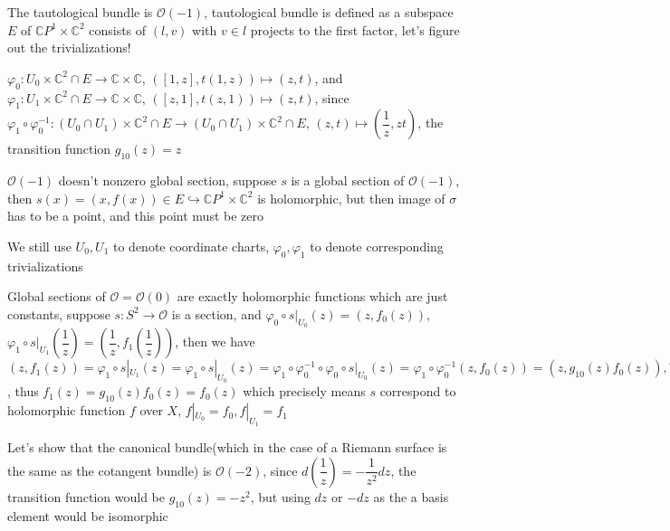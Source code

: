 \documentclass[main]{subfiles}
\begin{document}
\begin{definition}
The tautological bundle is $\mathcal{O}(-1)$, tautological bundle is defined as a subspace $E$ of $\mathbb CP^1\times\mathbb C^2$ consists of $(l,v)$ with $v\in l$ projects to the first factor, let's figure out the trivializations! \par
$\varphi_0: U_0\times\mathbb C^2\cap E\to\mathbb C\times\mathbb C$, $([1,z],t(1,z))\mapsto(z,t)$, and $\varphi_1: U_1\times\mathbb C^2\cap E\to\mathbb C\times\mathbb C$, $([z,1],t(z,1))\mapsto(z,t)$, since $\varphi_1\circ\varphi_0^{-1}: (U_0\cap U_1)\times\mathbb C^2\cap E\to(U_0\cap U_1)\times\mathbb C^2\cap E$, $(z,t)\mapsto\left(\dfrac{1}{z},zt\right)$, the transition function $g_{10}(z)=z$ \par
\end{definition}

\begin{remark}
$\mathcal{O}(-1)$ doesn't nonzero global section, suppose $s$ is a global section of $\mathcal{O}(-1)$, then $s(x)=(x,f(x))\in E\hookrightarrow\mathbb CP^1\times\mathbb C^2$ is holomorphic, but then image of $\sigma$ has to be a point, and this point must be zero\par
\end{remark}

\begin{example}
We still use $U_0,U_1$ to denote coordinate charts, $\varphi_0,\varphi_1$ to denote corresponding trivializations \par
Global sections of $\mathcal{O}=\mathcal{O}(0)$ are exactly holomorphic functions which are just constants, suppose $s: S^2\to \mathcal{O}$ is a section, and $\varphi_0\circ s|_{U_0}(z)=(z,f_0(z))$, $\varphi_1\circ s|_{U_1}\left(\dfrac{1}{z}\right)=\left(\dfrac{1}{z},f_1\left(\dfrac{1}{z}\right)\right)$, then we have $(z,f_1(z))=\varphi_1\circ s|_{U_1}(z)=\varphi_1\circ s|_{U_0}(z)=\varphi_1\circ\varphi_0^{-1}\circ\varphi_0\circ s|_{U_0}(z)=\varphi_1\circ\varphi_0^{-1}(z,f_0(z))=(z,g_{10}(z)f_0(z)), \forall z\in U_0\cap U_1$,
thus $f_1(z)=g_{10}(z)f_0(z)=f_0(z)$ which precisely means $s$ correspond to holomorphic function $f$ over $X$, $f|_{U_0}=f_0, f|_{U_1}=f_1$ \par
Let's show that the canonical bundle(which in the case of a Riemann surface is the same as the cotangent bundle) is $\mathcal{O}(-2)$, since $d\left(\dfrac{1}{z}\right)=-\dfrac{1}{z^2}dz$, the transition function would be $g_{10}(z)=-z^{2}$, but using $dz$ or $-dz$ as the a basis element would be isomorphic
\end{example}
\end{document}
